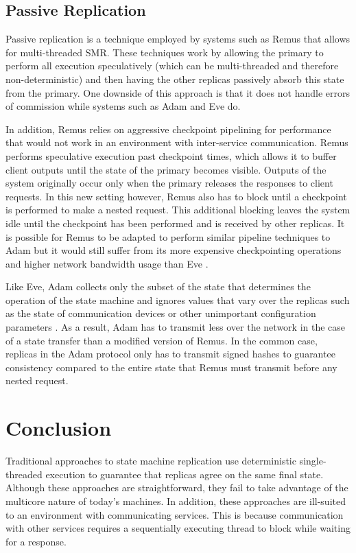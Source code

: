 \documentclass[11pt, oneside]{report}
\begin{document}
\section{Passive Replication}

Passive replication is a technique employed by systems such as Remus \cite{remus} that allows for multi-threaded SMR. 
These techniques work by allowing the primary to perform all execution speculatively (which can be multi-threaded and therefore non-deterministic) and then having the other replicas passively absorb this state from the primary.
One downside of this approach is that it does not handle errors of commission while systems such as Adam and Eve do.

In addition, Remus relies on aggressive checkpoint pipelining for performance that would not work in an environment with inter-service communication.
Remus performs speculative execution past checkpoint times, which allows it to buffer client outputs until the state of the primary becomes visible. 
Outputs of the system originally occur only when the primary releases the responses to client requests.
In this new setting however, Remus also has to block until a checkpoint is performed to make a nested request. 
This additional blocking leaves the system idle until the checkpoint has been performed and is received by other replicas.
It is possible for Remus to be adapted to perform similar pipeline techniques to Adam but it would still suffer from its more expensive checkpointing operations and higher network bandwidth usage than Eve \cite{eve}. 

Like Eve, Adam collects only the subset of the state that determines the operation of the state machine and ignores values that vary over the replicas such as the state of communication devices or other unimportant configuration parameters \cite{manosThesis}.
As a result, Adam has to transmit less over the network in the case of a state transfer than a modified version of Remus.
In the common case, replicas in the Adam protocol only has to transmit signed hashes to guarantee consistency compared to the entire state that Remus must transmit before any nested request.

\chapter{Conclusion}\label{Conclusion}

Traditional approaches to state machine replication use deterministic single-threaded execution to guarantee that replicas agree on the same final state. 
Although these approaches are straightforward, they fail to take advantage of the multicore nature of today's machines. 
In addition, these approaches are ill-suited to an environment with communicating services. 
This is because communication with other services requires a sequentially executing thread to block while waiting for a response. 
\end{document}
